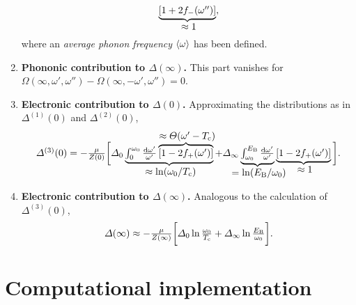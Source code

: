 \begin{enumerate}
\begin{gather*}
        \hypo{[1 + 2 f_-(\omega'')]}{\approx 1},
    \end{gather*}
    where an \emph{average phonon frequency} $\langle\omega\rangle$ has been defined.
    \item \textbf{Phononic contribution to \bm$\Delta(\infty)$.} This part
    vanishes for $\Omega(\infty, \omega', \omega'') - \Omega(\infty, -\omega',
    \omega'') = 0$.
    \item \textbf{Electronic contribution to \bm$\Delta(0)$.} Approximating the
    distributions as in $\Delta^{(1)}(0)$ and $\Delta^{(2)}(0)$,
    \begin{equation*}
        \Delta^{(3)}(0) = -\frac \mu {Z(0)} \bigg[
            \Delta_0 \hypo
                {\int_0^{\omega_0} \frac{\D \omega'}{\omega'}
                \hyper
                    {[1 - 2 f_+(\omega')]}
                    {\approx \Theta(\omega' - T \sub c)}}
                {\approx \ln(\omega_0 / T \sub c)}
            + \Delta_\infty \hypo
                {\int_{\omega_0}^{E \sub B}
                \frac{\D \omega'}{\omega'}}{= \ln(E \sub B / \omega_0)}
            \hypo{[1 - 2 f_+(\omega')]}{\approx 1}
        \bigg].
    \end{equation*}
    \item \textbf{Electronic contribution to \bm$\Delta(\infty)$.} Analogous to
    the calculation of $\Delta^{(3)}(0)$,
    \begin{equation*}
        \Delta(\infty) \approx -\frac \mu {Z(\infty)} \bigg[
            \Delta_0 \ln \frac{\omega_0}{T \sub c}
            + \Delta_\infty \ln \frac{E \sub B}{\omega_0}
        \bigg].
    \end{equation*}
\end{enumerate}

\section{Computational implementation}
